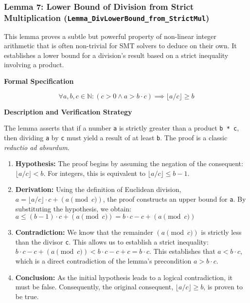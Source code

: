\documentclass[
  english,
  onecolumn]{article}
\providecommand{\tightlist}{%
  \setlength{\itemsep}{0pt}\setlength{\parskip}{0pt}}
\begin{document}
\subsubsection{\texorpdfstring{\textbf{Lemma 7: Lower Bound of Division
from Strict Multiplication
(\texttt{Lemma\_DivLowerBound\_from\_StrictMul})}}{Lemma 7: Lower Bound of Division from Strict Multiplication (Lemma\_DivLowerBound\_from\_StrictMul)}}\label{lemma-7-lower-bound-of-division-from-strict-multiplication-lemma_divlowerbound_from_strictmul}

This lemma proves a subtle but powerful property of non-linear integer
arithmetic that is often non-trivial for SMT solvers to deduce on their
own. It establishes a lower bound for a division's result based on a
strict inequality involving a product.

\textbf{Formal Specification}

\[
\forall a, b, c \in \mathbb{N} : (c > 0 \land a > b \cdot c) \implies \lfloor a/c \rfloor \ge b
\]

\textbf{Description and Verification Strategy}

The lemma asserts that if a number \texttt{a} is strictly greater than a
product \texttt{b\ *\ c}, then dividing \texttt{a} by \texttt{c} must
yield a result of at least \texttt{b}. The proof is a classic
\emph{reductio ad absurdum}.

\begin{enumerate}
\def\labelenumi{\arabic{enumi}.}
\tightlist
\item
  \textbf{Hypothesis:} The proof begins by assuming the negation of the
  consequent: \(\lfloor a/c \rfloor < b\). For integers, this is
  equivalent to \(\lfloor a/c \rfloor \le b - 1\).
\item
  \textbf{Derivation:} Using the definition of Euclidean division,
  \(a = \lfloor a/c \rfloor \cdot c + (a \pmod c)\), the proof
  constructs an upper bound for \texttt{a}. By substituting the
  hypothesis, we obtain:
  \(a \le (b - 1) \cdot c + (a \pmod c) = b \cdot c - c + (a \pmod c)\)
\item
  \textbf{Contradiction:} We know that the remainder \((a \pmod c)\) is
  strictly less than the divisor \texttt{c}. This allows us to establish
  a strict inequality:
  \(b \cdot c - c + (a \pmod c) < b \cdot c - c + c = b \cdot c\). This
  establishes that \(a < b \cdot c\), which is a direct contradiction of
  the lemma's precondition \(a > b \cdot c\).
\item
  \textbf{Conclusion:} As the initial hypothesis leads to a logical
  contradiction, it must be false. Consequently, the original
  consequent, \(\lfloor a/c \rfloor \ge b\), is proven to be true.
\end{enumerate}
\end{document}
